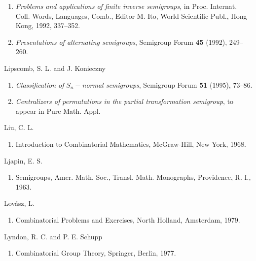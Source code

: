 \documentclass{surv-l}
\numberwithin{equation}{section}
\numberwithin{table}{section}
\numberwithin{figure}{section}
\theoremstyle{plain}
\theoremstyle{definition}
\begin{document}
\begin{thebibliography}{}
\begin{enumerate}
\item \label{bib43d} \emph{Problems and applications of finite inverse
semigroups}, in Proc. Internat. Coll. Words, Languages,
Comb., Editor M. Ito, World Scientific Publ., Hong Kong,
1992, 337--352.

\item \label{bib43e} \emph{Presentations of alternating semigroups},
Semigroup Forum \textbf{45} (1992), 249--260.
\end{enumerate}

\item[] Lipscomb, S. L. and J. Konieczny
\begin{enumerate}
\item \label{bib44} \emph{Classification of} $S_{n}-$\emph{normal
semigroups}, Semigroup Forum \textbf{51} (1995), 73--86.

\item \label{bib44a} \emph{Centralizers of permutations in the partial
transformation semigroup}, to appear in Pure Math. Appl.
\end{enumerate}

\item[] Liu, C. L.
\begin{enumerate}
\item \label{bib45} Introduction to Combinatorial Mathematics,
McGraw-Hill, New York, 1968.
\end{enumerate}

\item[] Ljapin, E. S.
\begin{enumerate}
\item \label{bib46} Semigroups, Amer. Math. Soc., Transl. Math.
Monographs, Providence, R. I., 1963.
\end{enumerate}

\item[] Lov\'{a}sz, L.
\begin{enumerate}
\item \label{bib47} Combinatorial Problems and Exercises, North Holland,
Amsterdam, 1979.
\end{enumerate}

\item[] Lyndon, R. C. and P. E. Schupp
\begin{enumerate}
\item \label{bib48} Combinatorial Group Theory, Springer, Berlin, 1977.
\end{enumerate}


\end{thebibliography}
\end{document}
